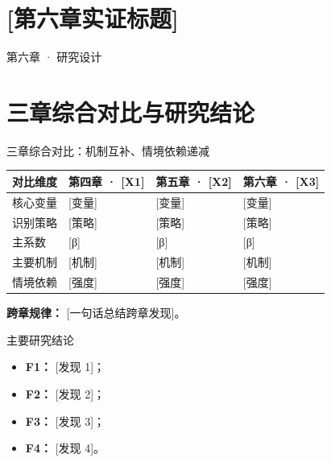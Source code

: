 \documentclass[10pt,aspectratio=169]{beamer}
\begin{document}
\section{[第六章实证标题]}

\begin{frame}{第六章 · 研究设计}
\end{frame}

\section{三章综合对比与研究结论}

\begin{frame}{三章综合对比：机制互补、情境依赖递减}
\centering\scriptsize
\setlength{\tabcolsep}{4pt}
\renewcommand{\arraystretch}{1.12}
\begin{tabular}{p{1.9cm} p{3.0cm} p{3.3cm} p{3.3cm}}
  \toprule
  对比维度 & 第四章 · [X1] & 第五章 · [X2] & 第六章 · [X3] \\
  \midrule
  核心变量   & [变量]  & [变量]  & [变量]  \\
  识别策略   & [策略]  & [策略]  & [策略]  \\
  主系数     & [β]     & [β]     & [β]     \\
  主要机制   & [机制]  & [机制]  & [机制]  \\
  情境依赖   & [强度]  & [强度]  & [强度]  \\
  \bottomrule
\end{tabular}

\vspace{0.5em}
\textbf{跨章规律：} [一句话总结跨章发现]。
\end{frame}

\begin{frame}{主要研究结论}
  \begin{itemize}
    \item \textbf{F1：} [发现 1]；
    \item \textbf{F2：} [发现 2]；
    \item \textbf{F3：} [发现 3]；
    \item \textbf{F4：} [发现 4]。
  \end{itemize}
\end{frame}
\end{document}
